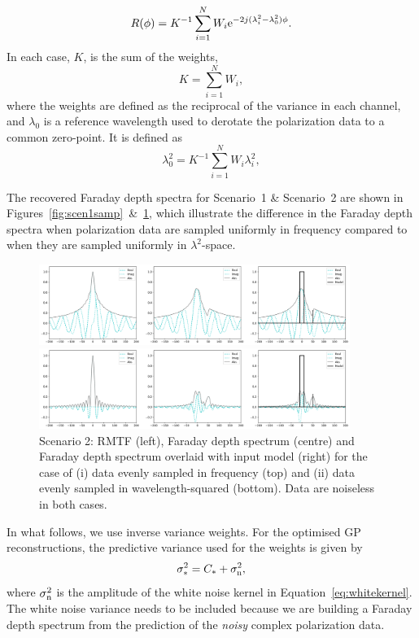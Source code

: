 \documentclass[fleqn,usenatbib]{mnras}
\begin{document}
%
\begin{equation}
R(\phi) = K^{-1}\sum_{i = 1}^{N}{W_i {\rm e}^{-2j (\lambda_i^2 - \lambda_0^2) \phi}}.
\end{equation}
%
In each case, $K$, is the sum of the weights, 
%
\begin{equation}
K = \sum_{i = 1}^{N}{W_i},
\end{equation}
%
where the weights are defined as the reciprocal of the variance in each channel, and $\lambda_0$ is a reference wavelength used to derotate the polarization data to a common zero-point. It is defined as
%
\begin{equation}
\lambda_0^2 = K^{-1}\sum_{i = 1}^{N}{W_i \lambda_i^2},
\end{equation}

The recovered Faraday depth spectra for Scenario~1 \& Scenario~2 are shown in Figures~\ref{fig:scen1samp}~\&~\ref{fig:scen2samp}, which illustrate the difference in the Faraday depth spectra when polarization data are sampled uniformly in frequency compared to when they are sampled uniformly in $\lambda^2$-space. 
%
\begin{figure}
\centerline{\includegraphics[width=0.9\textwidth]{./FIGURES/Scenario2_fsamp.png}}
\centerline{\includegraphics[width=0.9\textwidth]{./FIGURES/Scenario2_lsamp.png}}
\caption{\label{fig:scen2samp} Scenario 2: RMTF (left), Faraday depth spectrum (centre) and Faraday depth spectrum overlaid with input model (right) for the case of (i) data evenly sampled in frequency (top) and (ii) data evenly sampled in wavelength-squared (bottom). Data are noiseless in both cases.}
\end{figure}

In what follows, we use inverse variance weights. For the optimised GP reconstructions, the predictive variance used for the weights is given by
%
\begin{equation}
\label{eq:gpvar}
\sigma_{\ast}^2 = C_{\ast} + \sigma_{\rm n}^2,
\end{equation}
%
\citep{3569} where $\sigma_{\rm n}^2$ is the amplitude of the white noise kernel in Equation~\ref{eq:whitekernel}. The white noise variance needs to be included because we are building a Faraday depth spectrum from the prediction of the {\it noisy} complex polarization data. 
\end{document}
